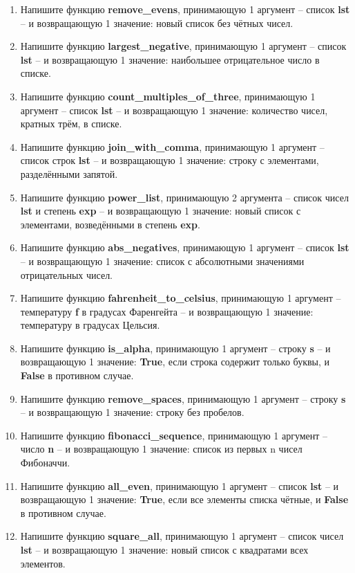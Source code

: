 \documentclass[a4,12pt]{article}
\theoremstyle{remark}
\begin{document}
\begin{enumerate}
    \item Напишите функцию \textbf{remove\_evens}, принимающую 1 аргумент – список \textbf{lst} – и возвращающую 1 значение: новый список без чётных чисел.
    \item Напишите функцию \textbf{largest\_negative}, принимающую 1 аргумент – список \textbf{lst} – и возвращающую 1 значение: наибольшее отрицательное число в списке.
    \item Напишите функцию \textbf{count\_multiples\_of\_three}, принимающую 1 аргумент – список \textbf{lst} – и возвращающую 1 значение: количество чисел, кратных трём, в списке.
    \item Напишите функцию \textbf{join\_with\_comma}, принимающую 1 аргумент – список строк \textbf{lst} – и возвращающую 1 значение: строку с элементами, разделёнными запятой.
    \item Напишите функцию \textbf{power\_list}, принимающую 2 аргумента – список чисел \textbf{lst} и степень \textbf{exp} – и возвращающую 1 значение: новый список с элементами, возведёнными в степень \textbf{exp}.
    \item Напишите функцию \textbf{abs\_negatives}, принимающую 1 аргумент – список \textbf{lst} – и возвращающую 1 значение: список с абсолютными значениями отрицательных чисел.
    \item Напишите функцию \textbf{fahrenheit\_to\_celsius}, принимающую 1 аргумент – температуру \textbf{f} в градусах Фаренгейта – и возвращающую 1 значение: температуру в градусах Цельсия.
    \item Напишите функцию \textbf{is\_alpha}, принимающую 1 аргумент – строку \textbf{s} – и возвращающую 1 значение: \textbf{True}, если строка содержит только буквы, и \textbf{False} в противном случае.
    \item Напишите функцию \textbf{remove\_spaces}, принимающую 1 аргумент – строку \textbf{s} – и возвращающую 1 значение: строку без пробелов.
    \item Напишите функцию \textbf{fibonacci\_sequence}, принимающую 1 аргумент – число \textbf{n} – и возвращающую 1 значение: список из первых n чисел Фибоначчи.
    \item Напишите функцию \textbf{all\_even}, принимающую 1 аргумент – список \textbf{lst} – и возвращающую 1 значение: \textbf{True}, если все элементы списка чётные, и \textbf{False} в противном случае.
    \item Напишите функцию \textbf{square\_all}, принимающую 1 аргумент – список чисел \textbf{lst} – и возвращающую 1 значение: новый список с квадратами всех элементов.

\end{enumerate}
\end{document}
